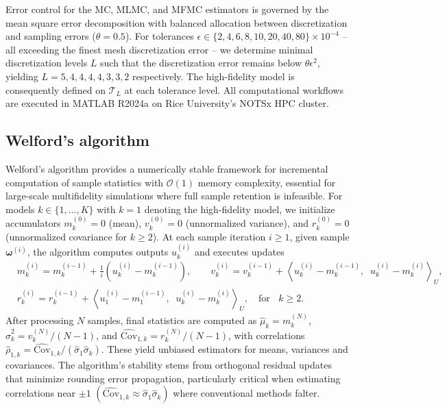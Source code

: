 Error control for the MC, MLMC, and MFMC estimators is governed by the mean square error decomposition with balanced allocation between discretization and sampling errors ($\theta = 0.5$). For tolerances $\epsilon \in \{2,4,6,8,10,20,40,80\} \times 10^{-4}$ -- all exceeding the finest mesh discretization error -- we determine minimal discretization levels $L$ such that the discretization error remains below $\theta \epsilon^2$, yielding $L = 5,4,4,4,4,3,3,2 $ respectively. The high-fidelity model is consequently defined on $\mathcal{T}_L$ at each tolerance level. All computational workflows are executed in MATLAB R2024a on Rice University's NOTSx HPC cluster.






\subsection{Welford's algorithm}
Welford's algorithm \cite{Welford:1962} provides a numerically stable framework for incremental computation of sample statistics with $\mathcal{O}(1)$ memory complexity, essential for large-scale multifidelity simulations where full sample retention is infeasible. For models $k \in \{1, \dots, K\}$ with $k=1$ denoting the high-fidelity model, we initialize accumulators $m_k^{(0)} = 0$ (mean), $v_k^{(0)} = 0$ (unnormalized variance), and $r_k^{(0)} = 0$ (unnormalized covariance for $k \geq 2$). At each sample iteration $i \geq 1$, given sample $\boldsymbol{\omega}^{(i)}$, the algorithm computes outputs $u_k^{(i)}$ and executes updates
%
\begin{align*}
    &m_k^{(i)} = m_k^{(i-1)} + \frac{1}{i}\left( u_{k}^{(i)}-m_k^{(i-1)}\right),\qquad v_k^{(i)} = v_k^{(i-1)} + \left\langle  u_{k}^{(i)}-m_k^{(i-1)}, \;\; u_{k}^{(i)}-m_k^{(i)}\right\rangle_U,\\
    &r_k^{(i)} = r_k^{(i-1)} + \left \langle  u_{1}^{(i)}-m_{1}^{(i-1)},\;\; u_{k}^{(i)}- m_{k}^{(i)}\right\rangle_U, \quad \text{for }\;\; k\ge 2.
\end{align*}
%
After processing $N$ samples, final statistics are computed as $\widehat{\mu}_k = m_k^{(N)}$, $\widehat{\sigma}_k^2 = v_k^{(N)}/(N-1)$, and $\widehat{\text{Cov}}_{1,k} = r_k^{(N)}/(N-1)$, with correlations $\widehat{\rho}_{1,k} = \widehat{\text{Cov}}_{1,k}/(\widehat{\sigma}_1 \widehat{\sigma}_k)$. These yield unbiased estimators for means, variances and covariances. The algorithm's stability stems from orthogonal residual updates that minimize rounding error propagation, particularly critical when estimating correlations near $\pm 1$ $(\widehat{\text{Cov}}_{1,k}\approx \widehat\sigma_1\widehat\sigma_k)$ where conventional methods falter.

